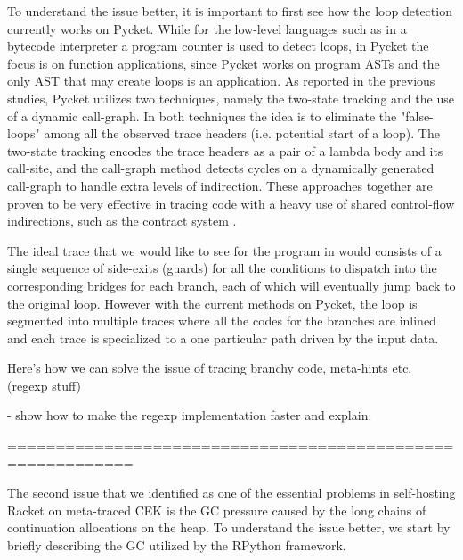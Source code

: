 To understand the issue better, it is important to first see how the
loop detection currently works on Pycket. While for the low-level
languages such as in a bytecode interpreter a program counter is used
to detect loops, in Pycket the focus is on function applications,
since Pycket works on program ASTs and the only AST that may create
loops is an application. As reported in the previous studies, Pycket
utilizes two techniques, namely the two-state tracking and the use of
a dynamic call-graph. In both techniques the idea is to eliminate the
"false-loops" among all the observed trace headers (i.e. potential
start of a loop). The two-state tracking encodes the trace headers as
a pair of a lambda body and its call-site, and the call-graph method
detects cycles on a dynamically generated call-graph to handle extra
levels of indirection. These approaches together are proven to be very
effective in tracing code with a heavy use of shared control-flow
indirections, such as the contract system \cite{pycket15,pycket17}.

The ideal trace that we would like to see for the program in
 would consists of a single sequence of side-exits
(guards) for all the conditions to dispatch into the corresponding
bridges for each branch, each of which will eventually jump back to
the original loop. However with the current methods on Pycket, the
loop is segmented into multiple traces where all the codes for the
branches are inlined and each trace is specialized to a one particular
path driven by the input data.

Here's how we can solve the issue of tracing branchy code, meta-hints
etc. (regexp stuff)

- show how to make the regexp implementation faster and explain.

===========================================================

The second issue that we identified as one of the essential problems
in self-hosting Racket on meta-traced CEK is the GC pressure caused by
the long chains of continuation allocations on the heap. To understand
the issue better, we start by briefly describing the GC utilized by
the RPython framework.

